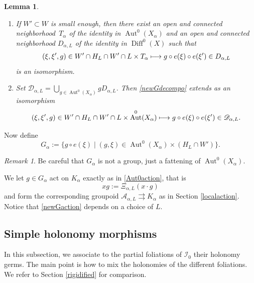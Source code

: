 \documentclass[JEP,XML,SOM,Unicode]{cedram}
\let\mathcal\mathscr
\def\mto{\mathchoice{\longmapsto}{\mapsto}{\mapsto}{\mapsto}}
\DeclareMathOperator{\Aut}{Aut}
\DeclareMathOperator{\Diff}{Diff}
\theoremstyle{plain}
\newtheorem{lemma}[theorem]{Lemma}
\theoremstyle{definition}
\theoremstyle{remark}
\newtheorem{remark}[theorem]{Remark}
\numberwithin{equation}{section}
\newcommand{\cI}{\mathcal{I}}
\begin{document}
\skpt\begin{lemma}
\label{newGdecompolemma}
\begin{enumerate}
\item
If $W'\subset W$ is small enough, then there exist an open and connected neighborhood~$T_\alpha$ of the identity in $\Aut^0(X_\alpha)$ and an open and connected neighborhood $D_{\alpha,L}$ of the identity in $\Diff^0(X)$ such that
\begin{equation}
\label{newGdecompo}
(\xi,\xi',g)\in W'\cap H_L\cap W'\cap L\times T_\alpha\mto g\circ e(\xi)\circ e(\xi')\in D_{\alpha,L}
\end{equation}
is an isomorphism.
\item
Set $\mathcal D_{\alpha,L}=\bigcup_{g\in \Aut^0(X_\alpha)}gD_{\alpha,L}$. Then \eqref{newGdecompo} extends as an isomorphism
\begin{equation}
\label{newGdecompoglobal}
(\xi,\xi',g)\in W'\cap H_L\cap W'\cap L\times \Aut^0(X_\alpha)\mto g\circ e(\xi)\circ e(\xi')\in \mathcal D_{\alpha,L}.
\end{equation}
\end{enumerate}
\end{lemma}

Now define
\begin{equation}
\label{newG}
G_\alpha:=\{g\circ e(\xi)\mid (g,\xi)\in\Aut^0(X_\alpha)\times (H_L\cap W')\}.
\end{equation}

\begin{remark}
\label{notagroup}
Be careful that $G_\alpha$ is not a group, just a fattening of $\Aut^0(X_\alpha)$.
\end{remark}
We let $g\in G_\alpha$ act on $K_\alpha$ exactly as in \eqref{Aut0action}, that is
\begin{equation}
\label{newGaction}
xg:=\Xi_{\alpha, L}(x\cdot g)
\end{equation}
and form the corresponding groupoid $\mathcal A_{\alpha,L}\rightrightarrows K_\alpha$ as in Section \ref{localaction}. Notice that \eqref{newGaction} depends on a choice of $L$.

\subsection{Simple holonomy morphisms}
\label{simpleholonomy}

In this subsection, we associate to the partial foliations of $\cI_0$ their holonomy germs. The main point is how to mix the holonomies of the different foliations. We refer to Section \ref{rigidified} for comparison.
\end{document}
